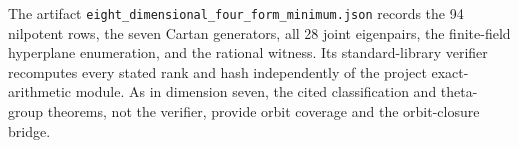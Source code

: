 The artifact \texttt{eight\_dimensional\_four\_form\_minimum.json} records
the 94 nilpotent rows, the seven Cartan generators, all 28 joint eigenpairs,
the finite-field hyperplane enumeration, and the rational witness.  Its
standard-library verifier recomputes every stated rank and hash independently
of the project exact-arithmetic module.  As in dimension seven, the cited
classification and theta-group theorems, not the verifier, provide orbit
coverage and the orbit-closure bridge.
